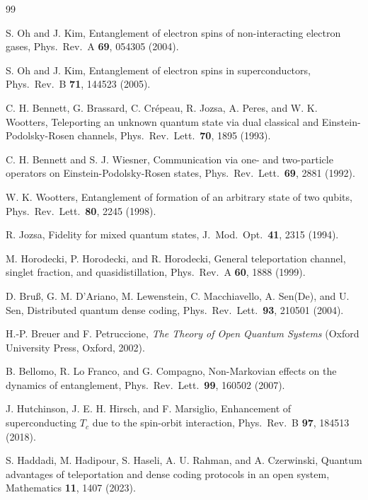 \documentclass[aps,prb,twocolumn,superscriptaddress,longbibliography]{revtex4-2}
\begin{document}
\begin{thebibliography}{99}

S. Oh and J. Kim, Entanglement of electron spins of non-interacting electron gases, Phys.\ Rev.\ A \textbf{69}, 054305 (2004).

S. Oh and J. Kim, Entanglement of electron spins in superconductors, Phys.\ Rev.\ B \textbf{71}, 144523 (2005).

C. H. Bennett, G. Brassard, C. Cr\'epeau, R. Jozsa, A. Peres, and W. K. Wootters, Teleporting an unknown quantum state via dual classical and Einstein-Podolsky-Rosen channels, Phys.\ Rev.\ Lett.\ \textbf{70}, 1895 (1993).

C. H. Bennett and S. J. Wiesner, Communication via one- and two-particle operators on Einstein-Podolsky-Rosen states, Phys.\ Rev.\ Lett.\ \textbf{69}, 2881 (1992).

W. K. Wootters, Entanglement of formation of an arbitrary state of two qubits, Phys.\ Rev.\ Lett.\ \textbf{80}, 2245 (1998).

R. Jozsa, Fidelity for mixed quantum states, J.\ Mod.\ Opt.\ \textbf{41}, 2315 (1994).

M. Horodecki, P. Horodecki, and R. Horodecki, General teleportation channel, singlet fraction, and quasidistillation, Phys.\ Rev.\ A \textbf{60}, 1888 (1999).

D. Bru\ss, G. M. D'Ariano, M. Lewenstein, C. Macchiavello, A. Sen(De), and U. Sen, Distributed quantum dense coding, Phys.\ Rev.\ Lett.\ \textbf{93}, 210501 (2004).

H.-P. Breuer and F. Petruccione, \emph{The Theory of Open Quantum Systems} (Oxford University Press, Oxford, 2002).

B. Bellomo, R. Lo Franco, and G. Compagno, Non-Markovian effects on the dynamics of entanglement, Phys.\ Rev.\ Lett.\ \textbf{99}, 160502 (2007).

J. Hutchinson, J. E. H. Hirsch, and F. Marsiglio, Enhancement of superconducting $T_{c}$ due to the spin-orbit interaction, Phys.\ Rev.\ B \textbf{97}, 184513 (2018).

S. Haddadi, M. Hadipour, S. Haseli, A. U. Rahman, and A. Czerwinski, Quantum advantages of teleportation and dense coding protocols in an open system, Mathematics \textbf{11}, 1407 (2023).


\end{thebibliography}
\end{document}
